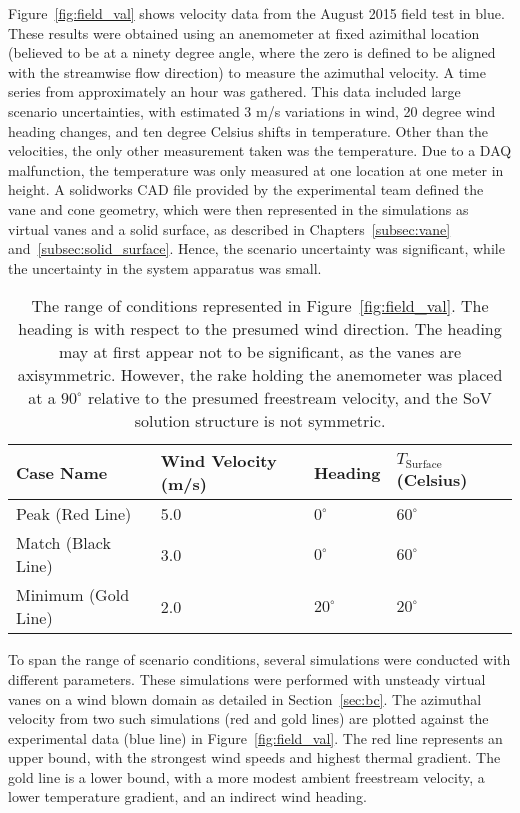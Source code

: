 Figure~\ref{fig:field_val} shows velocity data from the 
August 2015 field test in blue. These results were 
obtained using an anemometer at fixed
azimithal location (believed to be at a ninety degree angle, where the zero
is defined to be aligned with the streamwise flow direction) to measure the
azimuthal velocity. A time
series from approximately an hour was gathered. This data included large
scenario uncertainties, with estimated 3 m/s variations in wind, 20
degree wind heading changes, and ten degree Celsius shifts in
temperature. Other than the velocities, the only other measurement
taken was the temperature. Due to a DAQ malfunction, the
temperature was only measured at one location at one meter in height. 
A solidworks CAD file provided by the experimental team
defined the vane and cone geometry, which were then represented in the
simulations as virtual vanes and a solid surface, as described in 
Chapters~\ref{subsec:vane} and~\ref{subsec:solid_surface}. Hence, the
scenario uncertainty was significant, while the uncertainty in the
system apparatus was small. 

\begin{table}[!htb]
\centering
 \caption{The range of conditions represented in
 Figure~\ref{fig:field_val}. The heading is with respect to the presumed
 wind direction. The heading may at first appear not to be significant,
 as the vanes are axisymmetric. However, the rake holding
 the anemometer was placed at a $90^{\circ}$ relative to the presumed
 freestream velocity, and the SoV solution structure is not symmetric.}
\begin{tabular}{l|l|l|l}
Case Name & Wind Velocity (m/s) & Heading & $T_\text{Surface}$
 (Celsius) \\ 
 \hline
 Peak (Red Line) &  5.0  & $0^{\circ}$ & $60^{\circ}$ \\
 Match (Black Line) &  3.0  & $0^{\circ}$ & $60^{\circ}$ \\
 Minimum (Gold Line) &  2.0  & $20^{\circ}$ & $20^{\circ}$ \\
\end{tabular}
 \label{tab:val_cond}
\end{table}


To span the range of scenario conditions, several simulations were conducted
with different parameters. These simulations were performed with
unsteady virtual vanes on a wind blown domain as detailed in
Section~\ref{sec:bc}.  The azimuthal velocity from two such
simulations (red and gold lines) are plotted against the experimental
data (blue line) in Figure~\ref{fig:field_val}. The red line represents
an upper bound, with the strongest wind speeds and highest thermal
gradient. The gold line is a lower bound, with a more modest ambient
freestream velocity, a lower temperature gradient, and an indirect wind
heading. 

